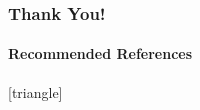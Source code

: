 \documentclass[18pt,xcolor=table]{beamer}
\let\oldfootnotesize\footnotesize
\renewcommand*{\footnotesize}{\oldfootnotesize\tiny}
\begin{document}

\begin{frame}[shrink=10]
\frametitle{Thank You!}
\framesubtitle{Recommended References}
    \nocite{DPGOverview}
    \nocite{EllisLC}
    \nocite{CamelliaDPG}
    \nocite{DemkowiczHeuer}
    \nocite{ChanHeuerThanhDemkowicz2012}
    \nocite{DPGStokes}
    \renewcommand*{\bibfont}{\small}
    [triangle]
    \printbibliography[keyword=main]
    \printbibliography[notkeyword=main]
\end{frame}


\end{document}
